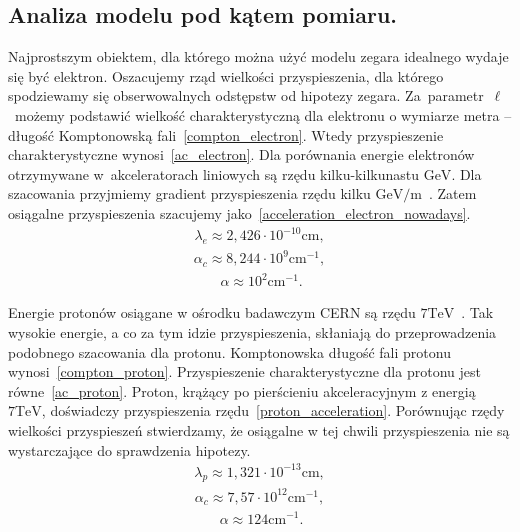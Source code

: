 \subsection{Analiza modelu pod kątem pomiaru.}
Najprostszym obiektem, dla którego można użyć modelu zegara 
idealnego wydaje się być elektron. 
Oszacujemy rząd wielkości przyspieszenia, dla którego spodziewamy się 
obserwowalnych odstępstw od hipotezy zegara.
Za~parametr~$\ell$~możemy podstawić wielkość charakterystyczną dla elektronu 
o wymiarze metra 
-- długość 
Komptonowską fali~\eqref{compton_electron}. 
Wtedy przyspieszenie charakterystyczne 
wynosi~\eqref{ac_electron}.
Dla porównania energie elektronów otrzymywane 
w~akceleratorach liniowych są rzędu 
kilku-kilkunastu $\si{\giga\electronvolt}$.
Dla szacowania przyjmiemy gradient przyspieszenia rzędu
kilku $ \si{\giga\electronvolt \per \metre}$~\cite{Ghotra2015}.
Zatem osiągalne przyspieszenia  
szacujemy jako~\eqref{acceleration_electron_nowadays}.
\begin{align}\label{compton_electron}
\lambda_e  \approx 2,426 \cdot 10^{-10} \si{\centi\metre} ,
\end{align}
\begin{align}\label{ac_electron}
\alpha_c \approx 8,244\cdot 10^{9} \si{ \centi\metre^{-1}} ,
\end{align}
\begin{align}~\label{acceleration_electron_nowadays}
\alpha \approx 10^2 \si{\centi\metre^{-1}} .
\end{align}

Energie protonów osiągane w ośrodku badawczym CERN są rzędu 
$7 \si{\tera\electronvolt}$~\cite{CERN}. 
Tak wysokie energie, a co za tym idzie przyspieszenia, skłaniają 
do przeprowadzenia podobnego szacowania dla protonu.
Komptonowska długość fali protonu wynosi~\eqref{compton_proton}. 
Przyspieszenie charakterystyczne dla protonu jest równe~\eqref{ac_proton}.
Proton, krążący po pierścieniu akceleracyjnym z energią  
$7 \si{\tera\electronvolt}$,
doświadczy przyspieszenia
rzędu~\eqref{proton_acceleration}.
Porównując rzędy wielkości przyspieszeń stwierdzamy, 
że osiągalne w tej chwili przyspieszenia nie są wystarczające 
do sprawdzenia hipotezy.
\begin{align}\label{compton_proton}
\lambda_p  \approx 1,321 \cdot 10^{-13} \si{\centi\metre} ,
\end{align}
\begin{align}\label{ac_proton}
\alpha_c \approx 7,57 \cdot 10^{12} \si{ \centi\metre^{-1}} ,
\end{align}
\begin{align}~\label{proton_acceleration}
\alpha \approx 124  \si{\centi\metre^{-1}} .
\end{align}

